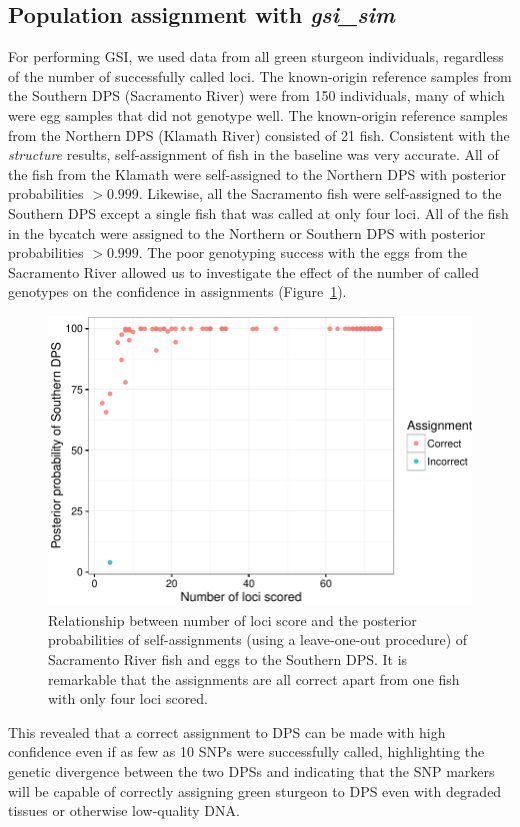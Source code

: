 \subsection{Population assignment with {\em gsi\_sim}}
For performing GSI, we used data from all green sturgeon individuals, 
regardless of the number of successfully called loci. 
The known-origin reference samples from the Southern DPS (Sacramento
River) were from 150 individuals, many of which were egg samples that did not
genotype well. The known-origin reference samples from the Northern DPS (Klamath River) 
consisted of 21
fish. Consistent with the {\em structure} results, self-assignment of fish in the
baseline was very accurate. All of the fish from the Klamath were self-assigned
to the Northern DPS with posterior probabilities $> 0.999$. Likewise, all the
Sacramento fish were self-assigned to the Southern DPS except a single fish that
was called at only four loci. All of the fish in the bycatch were assigned to the
Northern or Southern DPS with posterior probabilities $> 0.999$. The poor
genotyping success with the eggs from the Sacramento River allowed us
to investigate the effect of the number of called genotypes on the confidence in
assignments (Figure~\ref{fig:sacto-self-ass}).
\begin{figure}
\includegraphics[width = \linewidth]{inputs/self-ass-plot-crop.pdf}
\caption{ Relationship between number of loci score and the posterior probabilities of self-assignments 
(using a leave-one-out procedure) of Sacramento River fish and eggs to
the Southern DPS.  It is remarkable that the assignments are all correct apart from one fish with only four loci scored.  \label{fig:sacto-self-ass}}
\end{figure}
This revealed that a correct assignment to DPS can be made
with high confidence even if as few as 10 SNPs were successfully called,
highlighting the genetic divergence between the two DPSs and indicating that the
SNP markers will be capable of correctly assigning green sturgeon to DPS even with
degraded tissues or otherwise low-quality DNA.

